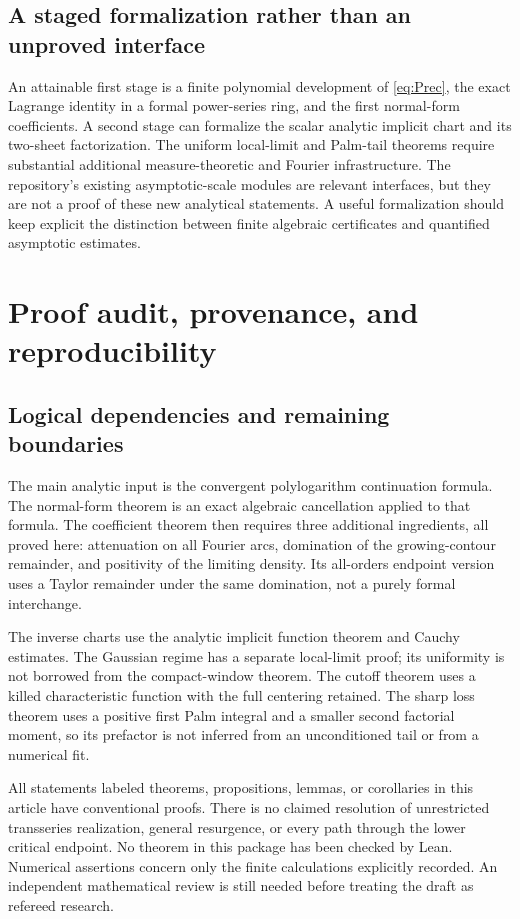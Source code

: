 \documentclass[11pt,a4paper]{article}
\numberwithin{equation}{section}
\theoremstyle{definition}
\theoremstyle{remark}
\begin{document}
\subsection{A staged formalization rather than an unproved interface}
An attainable first stage is a finite polynomial development of
\eqref{eq:Prec}, the exact Lagrange identity in a formal power-series
ring, and the first normal-form coefficients. A second stage can
formalize the scalar analytic implicit chart and its two-sheet
factorization. The uniform local-limit and Palm-tail theorems require
substantial additional measure-theoretic and Fourier infrastructure.
The repository's existing asymptotic-scale modules are relevant
interfaces, but they are not a proof of these new analytical statements.
A useful formalization should keep explicit the distinction between
finite algebraic certificates and quantified asymptotic estimates.

\section{Proof audit, provenance, and reproducibility}
\label{sec:audit}

\subsection{Logical dependencies and remaining boundaries}
The main analytic input is the convergent polylogarithm continuation
formula. The normal-form theorem is an exact algebraic cancellation
applied to that formula. The coefficient theorem then requires three
additional ingredients, all proved here: attenuation on all Fourier
arcs, domination of the growing-contour remainder, and positivity of
the limiting density. Its all-orders endpoint version uses a Taylor
remainder under the same domination, not a purely formal interchange.

The inverse charts use the analytic implicit function theorem and
Cauchy estimates. The Gaussian regime has a separate local-limit proof;
its uniformity is not borrowed from the compact-window theorem.
The cutoff theorem uses a killed characteristic function with the full
centering retained. The sharp loss theorem uses a positive first Palm
integral and a smaller second factorial moment, so its prefactor is not
inferred from an unconditioned tail or from a numerical fit.

All statements labeled theorems, propositions, lemmas, or corollaries in
this article have conventional proofs. There is no claimed resolution
of unrestricted transseries realization, general resurgence, or every
path through the lower critical endpoint. No theorem in this package
has been checked by Lean. Numerical assertions concern only the finite
calculations explicitly recorded. An independent mathematical review
is still needed before treating the draft as refereed research.
\end{document}
